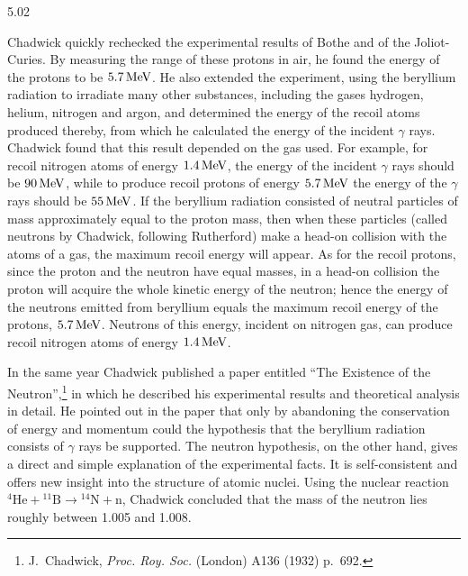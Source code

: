 \begin{solution}{5.02}
\begin{commentary}
Chadwick quickly rechecked the experimental results of Bothe and of the Joliot-Curies. By
measuring the range of these protons in air, he found the energy of the protons to be
$5.7\,\mathrm{MeV}$. He also extended the experiment, using the beryllium radiation to irradiate
many other substances, including the gases hydrogen, helium, nitrogen and argon, and
determined the energy of the recoil atoms produced thereby, from which he calculated the
energy of the incident $\gamma$ rays. Chadwick found that this result depended on the gas
used. For example, for recoil nitrogen atoms of energy $1.4\,\mathrm{MeV}$, the energy of the
incident $\gamma$ rays should be $90\,\mathrm{MeV}$, while to produce recoil protons of energy
$5.7\,\mathrm{MeV}$ the energy of the $\gamma$ rays should be $55\,\mathrm{MeV}$. If the beryllium
radiation consisted of neutral particles of mass approximately equal to the proton mass, then
when these particles (called neutrons by Chadwick, following Rutherford) make a head-on
collision with the atoms of a gas, the maximum recoil energy will appear. As for the recoil
protons, since the proton and the neutron have equal masses, in a head-on collision the
proton will acquire the whole kinetic energy of the neutron; hence the energy of the neutrons
emitted from beryllium equals the maximum recoil energy of the protons, $5.7\,\mathrm{MeV}$.
Neutrons of this energy, incident on nitrogen gas, can produce recoil nitrogen atoms of
energy $1.4\,\mathrm{MeV}$.

In the same year Chadwick published a paper entitled ``The Existence of the Neutron'',\footnote{J.~Chadwick,
\emph{Proc. Roy. Soc.} (London) A136 (1932) p.~692.} in which he described his experimental
results and theoretical analysis in detail. He pointed out in the paper that only by
abandoning the conservation of energy and momentum could the hypothesis that the beryllium
radiation consists of $\gamma$ rays be supported. The neutron hypothesis, on the other hand,
gives a direct and simple explanation of the experimental facts. It is self-consistent and
offers new insight into the structure of atomic nuclei. Using the nuclear reaction
${}^{4}\mathrm{He} + {}^{11}\mathrm{B} \rightarrow {}^{14}\mathrm{N} + \mathrm{n}$, Chadwick
concluded that the mass of the neutron lies roughly between 1.005 and 1.008.
\end{commentary}
\end{solution}

